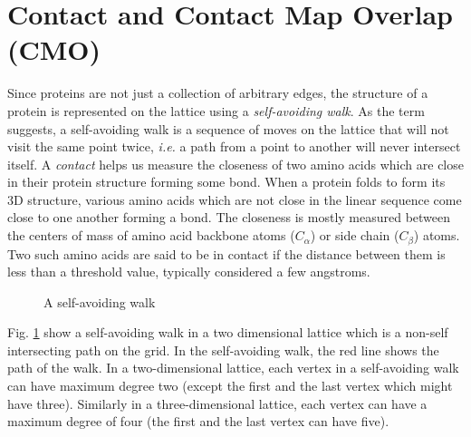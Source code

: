 \section{Contact and Contact Map Overlap (CMO)}
Since proteins are not just a collection of arbitrary edges, the structure of a protein is represented on the lattice using a {\it self-avoiding walk}. As the term suggests, a self-avoiding walk is a sequence of moves on the lattice that will not visit the same point twice, \emph{i.e.} a path from a point to another will never intersect itself.
A {\it contact} helps us measure the closeness of two amino acids which are close in their protein structure forming some bond. When a protein folds to form its 3D structure, various amino acids which are not close in the linear sequence come close to one another forming a bond. The closeness is mostly measured between the centers of mass of amino acid backbone atoms ($C_ \alpha$) or side chain ($C_ \beta$) atoms. Two such amino acids are said to be in contact if the distance between them is less than a threshold value, typically considered a few angstroms.

\begin{figure}[ht]
\centering
 
 \caption{A self-avoiding walk}
 \label{fig:A self-avoiding walk}
\end{figure}

Fig. \ref{fig:A self-avoiding walk} show a self-avoiding walk in a two dimensional lattice which is a non-self intersecting path on the grid. In the self-avoiding walk, the red line shows the path of the walk. In a two-dimensional lattice, each vertex in a self-avoiding walk can have maximum degree two (except the first and the last vertex which might have three). Similarly in a three-dimensional lattice, each vertex can have a maximum degree of four (the first and the last vertex can have five).

